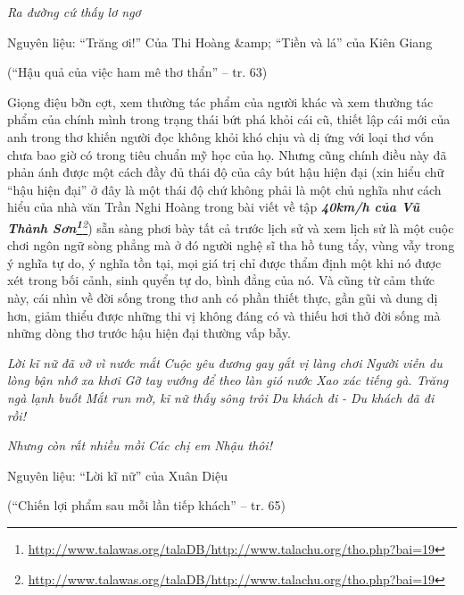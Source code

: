 \documentclass[../main.tex]{subfiles}
\begin{document}
\begin{multicols}{2}
\begin{blockquote}
\textit{Ra đường cứ thấy lơ ngơ} 

Nguyên liệu: “Trăng ơi!” Của Thi Hoàng &amp; “Tiền và lá” của Kiên Giang 

(“Hậu quả của việc ham mê thơ thẩn” – tr. 63) 

\end{blockquote}


Giọng điệu bỡn cợt, xem thường tác phẩm của người khác và xem thường tác phẩm của chính mình trong trạng thái bứt phá khỏi cái cũ, thiết lập cái mới của anh trong thơ khiến người đọc không khỏi khó chịu và dị ứng với loại thơ vốn chưa bao giờ có trong tiêu chuẩn mỹ học của họ. Nhưng cũng chính điều này đã phản ánh được một cách đầy đủ thái độ của cây bút hậu hiện đại (xin hiểu chữ “hậu hiện đại” ở đây là một thái độ chứ không phải là một chủ nghĩa như cách hiểu của nhà văn Trần Nghi Hoàng trong bài viết về tập\textit{\textbf{ 40km/h của Vũ Thành Sơn\footnote{\url{http://www.talawas.org/talaDB/http://www.talachu.org/tho.php?bai=19}}}\footnote{\url{http://www.talawas.org/talaDB/http://www.talachu.org/tho.php?bai=19}}}) sẵn sàng phơi bày tất cả trước lịch sử và xem lịch sử là một cuộc chơi ngôn ngữ sòng phẳng mà ở đó người nghệ sĩ tha hồ tung tẩy, vùng vẫy trong ý nghĩa tự do, ý nghĩa tồn tại, mọi giá trị chỉ được thẩm định một khi nó được xét trong bối cảnh, sinh quyển tự do, bình đẳng của nó. Và cũng từ cảm thức này, cái nhìn về đời sống trong thơ anh có phần thiết thực, gần gũi và dung dị hơn, giảm thiểu được những thi vị không đáng có và thiếu hơi thở đời sống mà những dòng thơ trước hậu hiện đại thường vấp bẫy. 
\begin{blockquote}


\textit{Lời kĩ nữ đã vỡ vì nước mắt} 
\textit{Cuộc yêu đương gay gắt vị làng chơi} 
\textit{Người viễn du lòng bận nhớ xa khơi} 
\textit{Gỡ tay vướng để theo làn gió nước} 
\textit{Xao xác tiếng gà. Trăng ngà lạnh buốt} 
\textit{Mắt run mờ, kĩ nữ thấy sông trôi} 
\textit{Du khách đi} 
\textit{- Du khách đã đi rồi!} 

\textit{Nhưng còn rất nhiều mồi} 
\textit{Các chị em} 
\textit{Nhậu thôi!} 

Nguyên liệu: “Lời kĩ nữ” của Xuân Diệu 

(“Chiến lợi phẩm sau mỗi lần tiếp khách” – tr. 65) 

\end{blockquote}



\end{multicols}
\end{document}
